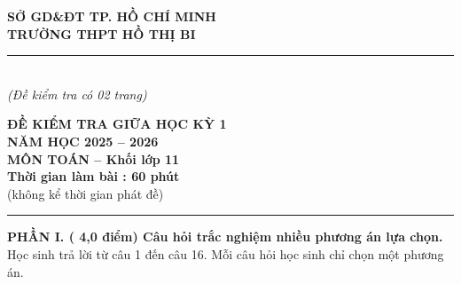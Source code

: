 \documentclass[11pt,a4paper,oneside]{article}
\begin{document}
	
\begin{minipage}[t]{0.38\textwidth}
	\begin{center}
	{\large\bfseries SỞ GD\&ĐT TP. HỒ CHÍ MINH\\
	TRƯỜNG THPT HỒ THỊ BI}\\%
\rule{3.6cm}{0.8pt}\\[-0.2em]
{\itshape (Đề kiểm tra có 02 trang)}	
	\end{center}
\end{minipage}\hfill
\begin{minipage}[t]{0.45\textwidth}
	\centering
	{\Large\bfseries ĐỀ KIỂM TRA GIỮA HỌC KỲ 1}\\[-0.15em]
	{\Large\bfseries NĂM HỌC 2025 -- 2026}\\[-0.15em]
	{\Large\bfseries MÔN TOÁN -- Khối lớp 11}\\[0.25em]
	{\bfseries Thời gian làm bài : 60 phút}\\[-0.15em]
	{(không kể thời gian phát đề)}
\end{minipage}

\vspace{0.1cm}
\noindent\rule{\textwidth}{1pt}
\textbf{PHẦN I. ( 4,0 điểm) Câu hỏi trắc nghiệm nhiều phương án lựa chọn.} Học sinh trả lời từ câu 1 đến câu 16. Mỗi câu hỏi học sinh chỉ chọn một phương án.
\end{document}
